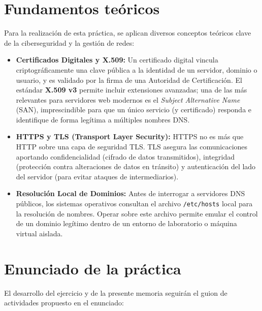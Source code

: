 \section{Fundamentos teóricos}
Para la realización de esta práctica, se aplican diversos conceptos teóricos clave de la ciberseguridad y la gestión de redes:
\begin{itemize}
    \item \textbf{Certificados Digitales y X.509:} Un certificado digital vincula criptográficamente una clave pública a la identidad de un servidor, dominio o usuario, y es validado por la firma de una Autoridad de Certificación. El estándar \textbf{X.509 v3} permite incluir extensiones avanzadas; una de las más relevantes para servidores web modernos es el \textit{Subject Alternative Name} (SAN), imprescindible para que un único servicio (y certificado) responda e identifique de forma legítima a múltiples nombres DNS.
    \item \textbf{HTTPS y TLS (Transport Layer Security):} HTTPS no es más que HTTP sobre una capa de seguridad TLS. TLS asegura las comunicaciones aportando confidencialidad (cifrado de datos transmitidos), integridad (protección contra alteraciones de datos en tránsito) y autenticación del lado del servidor (para evitar ataques de intermediarios).
    \item \textbf{Resolución Local de Dominios:} Antes de interrogar a servidores DNS públicos, los sistemas operativos consultan el archivo \texttt{/etc/hosts} local para la resolución de nombres. Operar sobre este archivo permite emular el control de un dominio legítimo dentro de un entorno de laboratorio o máquina virtual aislada.
\end{itemize}

\section{Enunciado de la práctica}
El desarrollo del ejercicio y de la presente memoria seguirán el guion de actividades propuesto en el enunciado:

